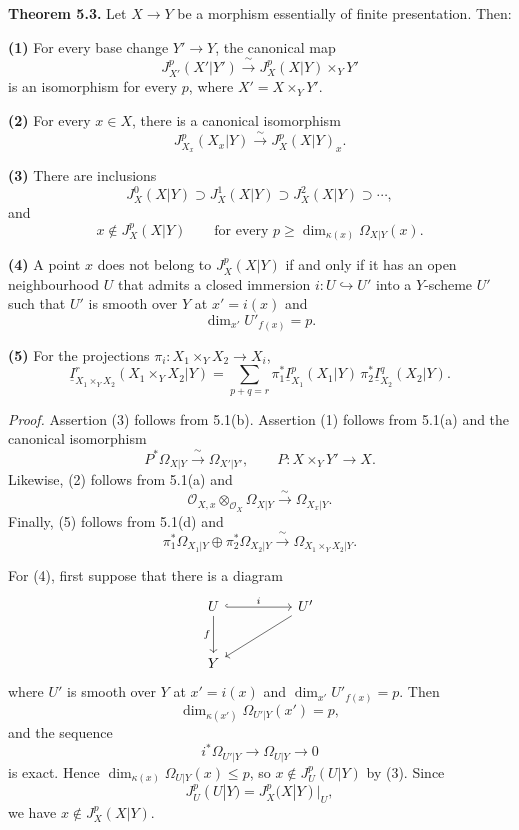 \medskip
\noindent\textbf{Theorem 5.3.}
Let $X\longrightarrow Y$ be a morphism essentially of finite
presentation. Then:

\smallskip
\noindent\textbf{(1)} For every base change $Y'\longrightarrow Y$,
the canonical map
\[
J_{X'}^p(X'|Y')\xrightarrow{\ \sim\ }
J_X^p(X|Y)\times_YY'
\]
is an isomorphism for every $p$, where $X'=X\times_YY'$.

\smallskip
\noindent\textbf{(2)} For every $x\in X$, there is a canonical
isomorphism
\[
J_{X_x}^p(X_x|Y)\xrightarrow{\ \sim\ }J_X^p(X|Y)_x.
\]

\smallskip
\noindent\textbf{(3)} There are inclusions
\[
J_X^0(X|Y)\supset J_X^1(X|Y)\supset J_X^2(X|Y)\supset\cdots,
\]
and
\[
x\notin J_X^p(X|Y)
\qquad\text{for every }p\geq
\dim_{\kappa(x)}\Omega_{X|Y}(x).
\]

\smallskip
\noindent\textbf{(4)} A point $x$ does not belong to
$J_X^p(X|Y)$ if and only if it has an open neighbourhood $U$ that
admits a closed immersion $i:U\hookrightarrow U'$ into a $Y$-scheme
$U'$ such that $U'$ is smooth over $Y$ at $x'=i(x)$ and
\[
\dim_{x'}U'_{f(x)}=p.
\]

\smallskip
\noindent\textbf{(5)} For the projections
$\pi_i:X_1\times_YX_2\longrightarrow X_i$,
\[
\underline I_{X_1\times_YX_2}^r(X_1\times_YX_2|Y)
=\sum_{p+q=r}
 \pi_1^*\underline I_{X_1}^p(X_1|Y)\,
 \pi_2^*\underline I_{X_2}^q(X_2|Y).
\]

\smallskip
\noindent\textit{Proof.}
Assertion (3) follows from 5.1(b). Assertion (1) follows from 5.1(a)
and the canonical isomorphism
\[
P^*\Omega_{X|Y}\xrightarrow{\ \sim\ }\Omega_{X'|Y'},
\qquad P:X\times_YY'\longrightarrow X.
\]
Likewise, (2) follows from 5.1(a) and
\[
\mathcal O_{X,x}\otimes_{\mathcal O_X}\Omega_{X|Y}
\xrightarrow{\ \sim\ }\Omega_{X_x|Y}.
\]
Finally, (5) follows from 5.1(d) and
\[
\pi_1^*\Omega_{X_1|Y}\oplus\pi_2^*\Omega_{X_2|Y}
\xrightarrow{\ \sim\ }
\Omega_{X_1\times_YX_2|Y}.
\]

For (4), first suppose that there is a diagram
\[
\begin{tikzcd}[column sep=huge,row sep=large]
U \arrow[r,hook,"i"] \arrow[d,"f"']
  & U' \arrow[dl] \\
Y & {}
\end{tikzcd}
\]
where $U'$ is smooth over $Y$ at $x'=i(x)$ and
$\dim_{x'}U'_{f(x)}=p$. Then
\[
\dim_{\kappa(x')}\Omega_{U'|Y}(x')=p,
\]
and the sequence
\[
i^*\Omega_{U'|Y}\longrightarrow\Omega_{U|Y}\longrightarrow0
\]
is exact. Hence
$\dim_{\kappa(x)}\Omega_{U|Y}(x)\leq p$, so
$x\notin J_U^p(U|Y)$ by (3). Since
\[
J_U^p(U|Y)=J_X^p(X|Y)|_U,
\]
we have $x\notin J_X^p(X|Y)$.

